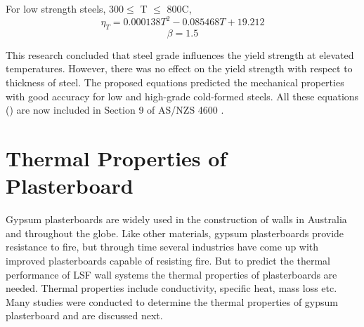 For low strength steels, 300$ \leq$ T $\leq$ 800\degree C,
\begin{equation}
\eta_T = 0.000138T^2 - 0.085468T + 19.212
\label{eq:yield_high5}
\end{equation}
\begin{equation*}
	\beta=1.5
\end{equation*}

This research concluded that steel grade influences the yield strength at elevated temperatures. However, there was no effect on the yield strength with respect to thickness of steel. The proposed equations predicted the mechanical properties with good accuracy for low and high-grade cold-formed steels. All these equations () are now included in Section 9 of AS/NZS 4600 \citet{ASNZ4600}.

\section{Thermal Properties of Plasterboard}

Gypsum plasterboards are widely used in the construction of walls in Australia and throughout the globe. Like other materials, gypsum plasterboards provide resistance to fire, but through time several industries have come up with improved plasterboards capable of resisting fire. But to predict the thermal performance of LSF wall systems the thermal properties of plasterboards are needed. Thermal properties include conductivity, specific heat, mass loss etc. Many studies were conducted to determine the thermal properties of gypsum plasterboard and are discussed next.

